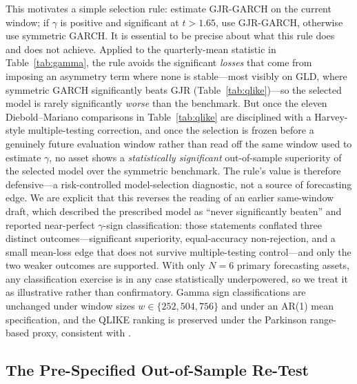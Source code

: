 This motivates a simple selection rule: estimate GJR-GARCH on the current window; if $\gamma$ is positive and significant at $t>1.65$, use GJR-GARCH, otherwise use symmetric GARCH. It is essential to be precise about what this rule does and does not achieve. Applied to the quarterly-mean statistic in Table~\ref{tab:gamma}, the rule avoids the significant \emph{losses} that come from imposing an asymmetry term where none is stable---most visibly on GLD, where symmetric GARCH significantly beats GJR (Table~\ref{tab:qlike})---so the selected model is rarely significantly \emph{worse} than the benchmark. But once the eleven Diebold--Mariano comparisons in Table~\ref{tab:qlike} are disciplined with a Harvey-style multiple-testing correction, and once the selection is frozen before a genuinely future evaluation window rather than read off the same window used to estimate $\gamma$, no asset shows a \emph{statistically significant} out-of-sample superiority of the selected model over the symmetric benchmark. The rule's value is therefore defensive---a risk-controlled model-selection diagnostic, not a source of forecasting edge. We are explicit that this reverses the reading of an earlier same-window draft, which described the prescribed model as ``never significantly beaten'' and reported near-perfect $\gamma$-sign classification: those statements conflated three distinct outcomes---significant superiority, equal-accuracy non-rejection, and a small mean-loss edge that does not survive multiple-testing control---and only the two weaker outcomes are supported. With only $N=6$ primary forecasting assets, any classification exercise is in any case statistically underpowered, so we treat it as illustrative rather than confirmatory. Gamma sign classifications are unchanged under window sizes $w\in\{252,504,756\}$ and under an AR(1) mean specification, and the QLIKE ranking is preserved under the Parkinson range-based proxy, consistent with \citet{patton2011}.

\subsection{The Pre-Specified Out-of-Sample Re-Test}
\label{sec:prespec_retest}

